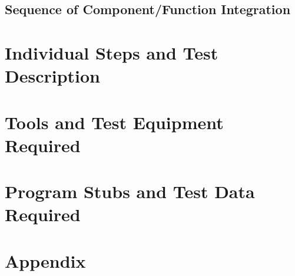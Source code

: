 \documentclass[12pt, a4paper]{article}
\begin{document}
        \subsection{Sequence of Component/Function Integration}
    	
        
    \newpage
    \section{Individual Steps and Test Description}
            
    
    \newpage
    \section{Tools and Test Equipment Required}
            

    \newpage    
    \section{Program Stubs and Test Data Required}
         
        
    \newpage
    \section*{Appendix}
        
\end{document}
